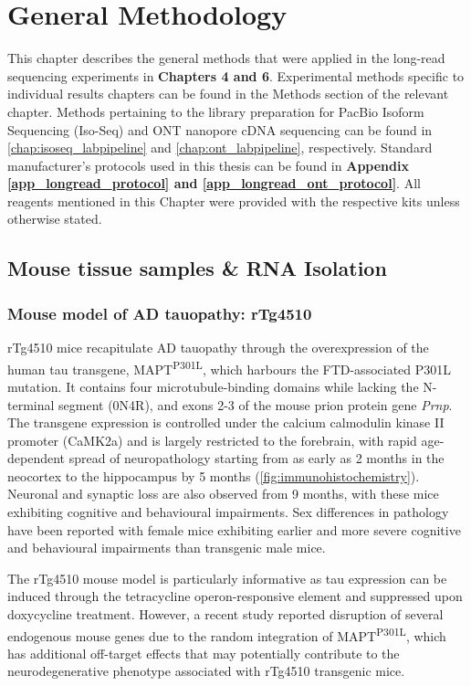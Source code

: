 \chapter{General Methodology}\label{ch: general methodology}

This chapter describes the general methods that were applied in the long-read sequencing experiments in \textbf{Chapters 4 and 6}. Experimental methods specific to individual results chapters can be found in the Methods section of the relevant chapter. Methods pertaining to the library preparation for PacBio Isoform Sequencing (Iso-Seq) and ONT nanopore cDNA sequencing can be found in \cref{chap:isoseq_labpipeline} and \cref{chap:ont_labpipeline}, respectively. Standard manufacturer's protocols used in this thesis can be found in \textbf{Appendix \ref{app_longread_protocol} and \ref{app_longread_ont_protocol}}. All reagents mentioned in this Chapter were provided with the respective kits unless otherwise stated.

\section{Mouse tissue samples \& RNA Isolation}

\subsection{Mouse model of AD tauopathy: rTg4510} 
\label{ch2: rtg4510}
rTg4510 mice recapitulate AD tauopathy through the overexpression of the human tau transgene, MAPT\textsuperscript{P301L}, which harbours the FTD-associated P301L mutation. It contains four microtubule-binding domains while lacking the N-terminal segment (0N4R), and exons 2-3 of the mouse prion protein gene \textit{Prnp}. The transgene expression is controlled under the calcium calmodulin kinase II promoter (CaMK2a) and is largely restricted to the forebrain, with rapid age-dependent spread of neuropathology starting from as early as 2 months in the neocortex to the hippocampus by 5 months (\cref{fig:immunohistochemistry}). Neuronal and synaptic loss are also observed from 9 months, with these mice exhibiting cognitive and behavioural impairments. Sex differences in pathology have been reported with female mice exhibiting earlier and more severe cognitive and behavioural impairments than transgenic male mice\cite{M2011}. 

The rTg4510 mouse model is particularly informative as tau expression can be induced through the tetracycline operon-responsive element and suppressed upon doxycycline treatment\cite{Ramsden2005}. However, a recent study reported disruption of several endogenous mouse genes due to the random integration of MAPT\textsuperscript{P301L}, which has additional off-target effects that may potentially contribute to the neurodegenerative phenotype associated with rTg4510 transgenic mice\cite{Gamache2019}. 
 

